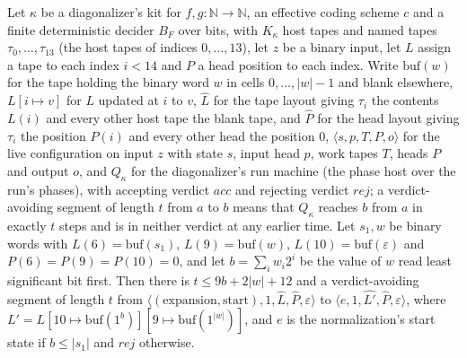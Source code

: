 \begin{theorem}
\label{Turing.NTimeDiag.dz_test}
\leanok
{}
Let $\kappa$ be a diagonalizer's kit for $f, g : \mathbb{N} \to \mathbb{N}$, an effective coding scheme $c$ and a finite deterministic decider $B_F$ over bits, with $K_\kappa$ host tapes and named tapes $\tau_0, \dots, \tau_{13}$ (the host tapes of indices $0, \dots, 13$), let $z$ be a binary input, let $L$ assign a tape to each index $i < 14$ and $P$ a head position to each index. Write $\mathrm{buf}(w)$ for the tape holding the binary word $w$ in cells $0, \dots, |w| - 1$ and blank elsewhere, $L[i \mapsto v]$ for $L$ updated at $i$ to $v$, $\hat L$ for the tape layout giving $\tau_i$ the contents $L(i)$ and every other host tape the blank tape, and $\hat P$ for the head layout giving $\tau_i$ the position $P(i)$ and every other head the position $0$, $\langle s, p, T, P, o\rangle$ for the live configuration on input $z$ with state $s$, input head $p$, work tapes $T$, heads $P$ and output $o$, and $Q_\kappa$ for the diagonalizer's run machine (the phase host over the run's phases), with accepting verdict $\mathit{acc}$ and rejecting verdict $\mathit{rej}$; a verdict-avoiding segment of length $t$ from $a$ to $b$ means that $Q_\kappa$ reaches $b$ from $a$ in exactly $t$ steps and is in neither verdict at any earlier time. Let $s_1, w$ be binary words with $L(6) = \mathrm{buf}(s_1)$, $L(9) = \mathrm{buf}(w)$, $L(10) = \mathrm{buf}(\varepsilon)$ and $P(6) = P(9) = P(10) = 0$, and let $b = \sum_i w_i 2^i$ be the value of $w$ read least significant bit first. Then there is $t \le 9b + 2|w| + 12$ and a verdict-avoiding segment of length $t$ from $\langle (\text{expansion}, \text{start}), 1, \hat L, \hat P, \varepsilon\rangle$ to $\langle e, 1, \hat{L'}, \hat P, \varepsilon\rangle$, where $L' = L[10 \mapsto \mathrm{buf}(1^b)][9 \mapsto \mathrm{buf}(1^{|w|})]$, and $e$ is the normalization's start state if $b \le |s_1|$ and $\mathit{rej}$ otherwise.
\end{theorem}

